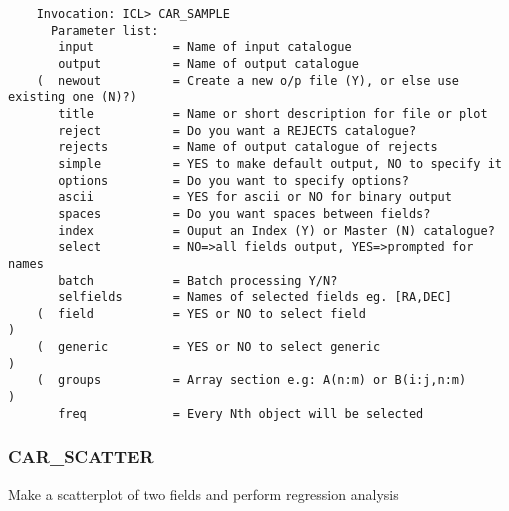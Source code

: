 \begin{verbatim}
    Invocation: ICL> CAR_SAMPLE
      Parameter list:
       input           = Name of input catalogue
       output          = Name of output catalogue
    (  newout          = Create a new o/p file (Y), or else use existing one (N)?)
       title           = Name or short description for file or plot
       reject          = Do you want a REJECTS catalogue?
       rejects         = Name of output catalogue of rejects
       simple          = YES to make default output, NO to specify it
       options         = Do you want to specify options?
       ascii           = YES for ascii or NO for binary output
       spaces          = Do you want spaces between fields?
       index           = Ouput an Index (Y) or Master (N) catalogue?
       select          = NO=>all fields output, YES=>prompted for names
       batch           = Batch processing Y/N?
       selfields       = Names of selected fields eg. [RA,DEC]
    (  field           = YES or NO to select field                               )
    (  generic         = YES or NO to select generic                             )
    (  groups          = Array section e.g: A(n:m) or B(i:j,n:m)                 )
       freq            = Every Nth object will be selected
\end{verbatim}

\subsubsection{CAR\_SCATTER}

Make a scatterplot of two fields and perform regression analysis

